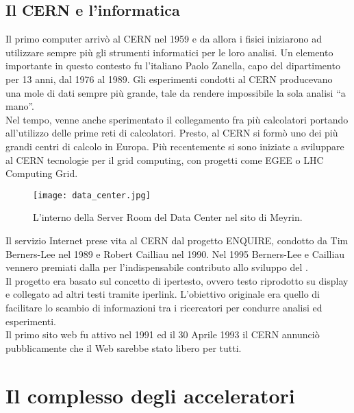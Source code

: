 		\subsection{Il CERN e l'informatica} \label{subsec:CERN;storia;informatica}
		
			Il primo computer arrivò al \ac{CERN} nel 1959 e da allora i fisici iniziarono ad utilizzare sempre più gli strumenti informatici per le loro analisi. Un elemento importante in questo contesto fu l'italiano Paolo Zanella, capo del dipartimento  per 13 anni, dal 1976 al 1989. Gli esperimenti condotti al \ac{CERN} producevano una mole di dati sempre più grande, tale da rendere impossibile la sola analisi ``a mano''.\\
			Nel tempo, venne anche sperimentato il collegamento fra più calcolatori portando all'utilizzo delle prime reti di calcolatori. Presto, al \ac{CERN} si formò uno dei più grandi centri di calcolo in Europa. Più recentemente si sono iniziate a sviluppare al \ac{CERN} tecnologie per il grid computing, con progetti come \ac{EGEE} o LHC Computing Grid.\\
			
			\begin{figure}[h!]
				\begin{center}
					\texttt{[image: data\_center.jpg]}
				\end{center}
				\caption[Server Room del Data Center]{L'interno della Server Room del Data Center nel sito di Meyrin.}
				\label{fig:data_center}
			\end{figure}
			\noindent
			Il servizio Internet  prese vita al \ac{CERN} dal progetto ENQUIRE, condotto da Tim Berners-Lee nel 1989 e Robert Cailliau nel 1990. Nel 1995 Berners-Lee e Cailliau vennero premiati dalla  per l'indispensabile contributo allo sviluppo del .\\
			Il progetto era basato sul concetto di ipertesto, ovvero testo riprodotto su display e collegato ad altri testi tramite iperlink. L'obiettivo originale era quello di facilitare lo scambio di informazioni tra i ricercatori per condurre analisi ed esperimenti.\\
			Il primo sito web fu attivo nel 1991 ed il 30 Aprile 1993 il \ac{CERN} annunciò pubblicamente che il Web sarebbe stato libero per tutti.
			
	\section{Il complesso degli acceleratori} \label{sec:CERN;acceleratori}
	
